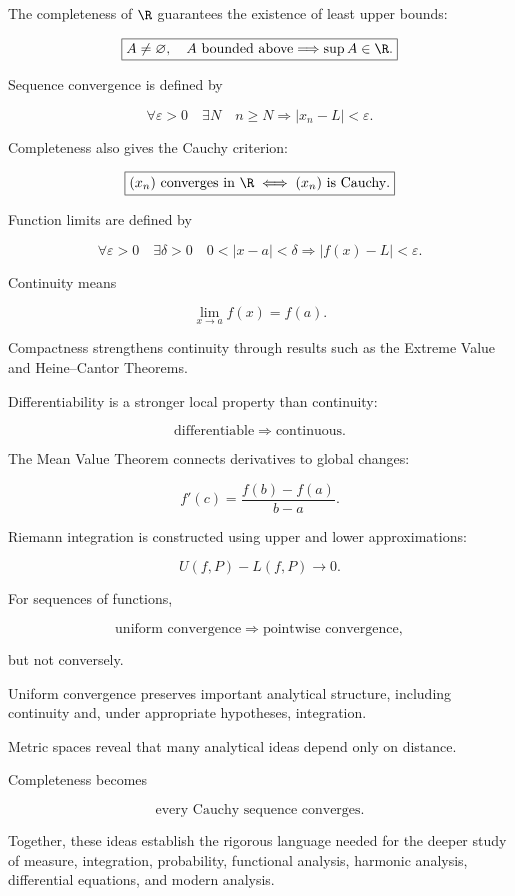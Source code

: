 The completeness of \(\R\) guarantees the existence of least upper bounds:

\[
\boxed{
A\neq\varnothing,\quad
A\text{ bounded above}
\Longrightarrow
\sup A\in\R.
}
\]

Sequence convergence is defined by

\[
\boxed{
\forall\varepsilon>0
\quad
\exists N
\quad
n\geq N
\Rightarrow
|x_n-L|<\varepsilon.
}
\]

Completeness also gives the Cauchy criterion:

\[
\boxed{
(x_n)\text{ converges in }\R
\iff
(x_n)\text{ is Cauchy}.
}
\]

Function limits are defined by

\[
\boxed{
\forall\varepsilon>0
\quad
\exists\delta>0
\quad
0<|x-a|<\delta
\Rightarrow
|f(x)-L|<\varepsilon.
}
\]

Continuity means

\[
\boxed{
\lim_{x\to a}f(x)=f(a).
}
\]

Compactness strengthens continuity through results such as the Extreme
Value and Heine--Cantor Theorems.

Differentiability is a stronger local property than continuity:

\[
\boxed{
\text{differentiable}
\Longrightarrow
\text{continuous}.
}
\]

The Mean Value Theorem connects derivatives to global changes:

\[
\boxed{
f'(c)
=
\frac{f(b)-f(a)}{b-a}.
}
\]

Riemann integration is constructed using upper and lower approximations:

\[
\boxed{
U(f,P)-L(f,P)\to0.
}
\]

For sequences of functions,

\[
\boxed{
\text{uniform convergence}
\Longrightarrow
\text{pointwise convergence},
}
\]

but not conversely.

Uniform convergence preserves important analytical structure, including
continuity and, under appropriate hypotheses, integration.

Metric spaces reveal that many analytical ideas depend only on distance.

Completeness becomes

\[
\boxed{
\text{every Cauchy sequence converges}.
}
\]

Together, these ideas establish the rigorous language needed for the deeper
study of measure, integration, probability, functional analysis, harmonic
analysis, differential equations, and modern analysis.


